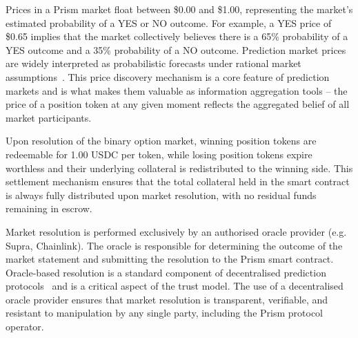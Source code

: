 \documentclass[11pt,a4paper]{article}
\begin{document}

Prices in a Prism market float between \$0.00 and \$1.00, representing the market's estimated probability of a YES or NO outcome. For example, a YES price of \$0.65 implies that the market collectively believes there is a 65\% probability of a YES outcome and a 35\% probability of a NO outcome. Prediction market prices are widely interpreted as probabilistic forecasts under rational market assumptions~\cite{wolfers2004}. This price discovery mechanism is a core feature of prediction markets and is what makes them valuable as information aggregation tools -- the price of a position token at any given moment reflects the aggregated belief of all market participants.

Upon resolution of the binary option market, winning position tokens are redeemable for 1.00 USDC per token, while losing position tokens expire worthless and their underlying collateral is redistributed to the winning side. This settlement mechanism ensures that the total collateral held in the smart contract is always fully distributed upon market resolution, with no residual funds remaining in escrow.

Market resolution is performed exclusively by an authorised oracle provider (e.g. Supra, Chainlink). The oracle is responsible for determining the outcome of the market statement and submitting the resolution to the Prism smart contract. Oracle-based resolution is a standard component of decentralised prediction protocols~\cite{poon2016} and is a critical aspect of the trust model. The use of a decentralised oracle provider ensures that market resolution is transparent, verifiable, and resistant to manipulation by any single party, including the Prism protocol operator.
\end{document}
